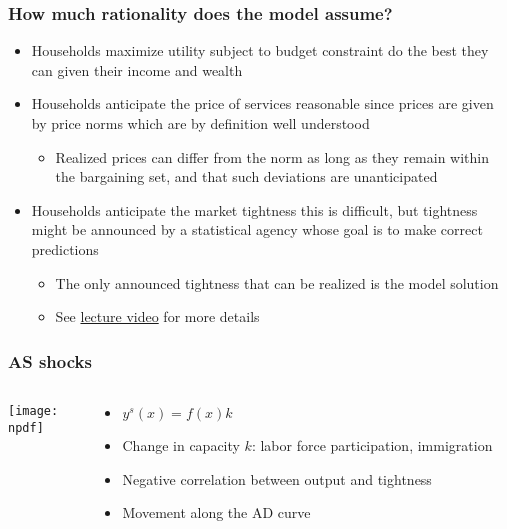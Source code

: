 \documentclass[11pt,aspectratio=169,xcolor={dvipsnames},hyperref={pdftex,pdfpagemode=UseNone,hidelinks,pdfdisplaydoctitle=true},usepdftitle=false]{beamer}
\newcommand{\npdf}{../figures/figures2.pdf}
\begin{document}
\begin{frame}
\frametitle{How much rationality does the model assume?}
\begin{itemize}
\item Households maximize utility subject to budget constraint \then do the best they can given their income and wealth
\item Households anticipate the price of services \then reasonable since prices are given by price norms which are by definition well understood
\begin{itemize}
	\item Realized prices can differ from the norm as long as they remain within the bargaining set, and that such deviations are unanticipated
\end{itemize}
\item Households anticipate the market tightness \then this is difficult, but tightness might be announced by a statistical agency whose goal is to make correct predictions
\begin{itemize}
\item The only announced tightness that can be realized is the model solution
\item See \href{https://youtu.be/2VR6BtXVPCU}{lecture video} for more details
\end{itemize}
\end{itemize}	
\end{frame}

\begin{frame}
\end{frame}

\begin{frame}
\frametitle{AS shocks}
\begin{columns}
\begin{column}{0.6\textwidth}
\texttt{[image: \\npdf]}%
\end{column}
\begin{column}{0.4\textwidth}
\begin{itemize}
	\item $y^s(x) = f(x) k$
	\item Change in capacity $k$: labor force participation, immigration
	\item Negative correlation between output and tightness
	\item Movement along the AD curve
\end{itemize}
\end{column}
\end{columns} 
\end{frame}
\end{document}
